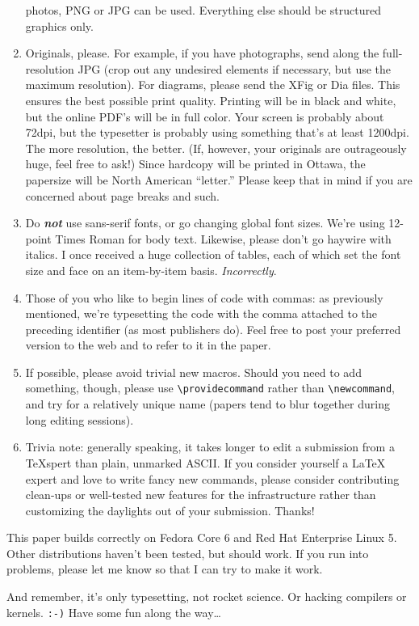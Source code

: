 \documentclass[final]{ols}
\begin{document}
\begin{enumerate}
  photos, PNG or JPG can be used.  Everything else should be structured
  graphics only.
\item Originals, please.  For example, if you have photographs, send
  along the full-resolution JPG (crop out any undesired elements if
  necessary, but use the maximum resolution).  For diagrams, please
  send the XFig or Dia files. 
  This ensures the best possible print quality.  Printing will be in
  black and white, but the online PDF's will be in full color.  Your
  screen is probably about 72dpi, but the typesetter is probably using
  something that's at least 1200dpi.  The more resolution, the better.
  (If, however, your originals are outrageously huge, feel free to ask!)
  Since hardcopy will be printed in Ottawa, the papersize will be
  North American ``letter.''  Please keep that in mind if you are
  concerned about page breaks and such.
\item Do \textbf{\textit{not}} use sans-serif fonts, or go changing
  global font sizes.  We're using 12-point Times Roman for body text.
  Likewise, please don't go haywire with italics.  I once received a
  huge collection of tables, each of which set the font size and face
  on an item-by-item basis.  \textit{Incorrectly}.  
\item Those of you who like to begin lines of code with commas:  as
  previously mentioned, we're
  typesetting the code with the comma attached to the preceding
  identifier (as most publishers do).  Feel free to post your
  preferred version to the web and to refer to it in the paper.
\item If possible, please avoid trivial new macros.  Should you need
  to add something, though, please use
  \texttt{{\textbackslash}providecommand} rather than
  \texttt{{\textbackslash}newcommand}, and try for a relatively
  unique name (papers tend to blur together during long editing sessions).
\item Trivia note:  generally speaking, it takes longer to edit a
  submission from a {\TeX}spert than plain, unmarked ASCII.  If you
  consider yourself a {\LaTeX} expert and love to write fancy new
  commands, please consider contributing clean-ups or well-tested
  new features for the infrastructure rather than customizing the
  daylights out of your submission.  Thanks!
\end{enumerate}

This paper builds correctly on Fedora Core 6 and Red Hat Enterprise Linux
5.  Other distributions haven't been tested, but should work.  If you run
into problems, please let me know so that I can try to make it work.

And remember, it's only typesetting, not rocket science.  Or hacking
compilers or kernels.  \texttt{:-)}  Have some fun along the way\ldots
\end{document}
